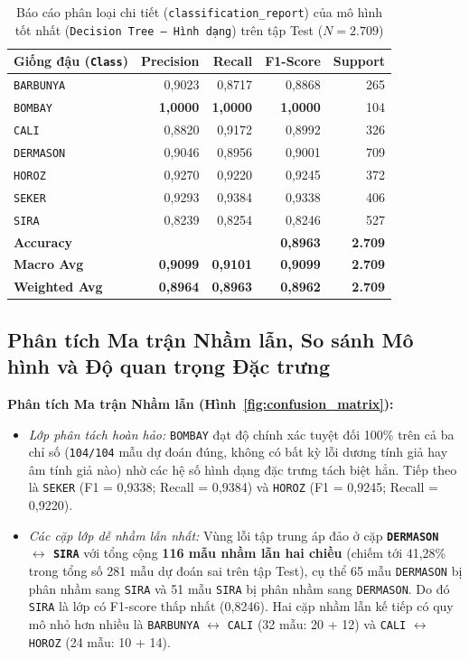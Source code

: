 \documentclass[a4paper,12pt]{report}
\begin{document}
\begin{table}[H]
\centering
\caption{Báo cáo phân loại chi tiết (\texttt{classification\_report}) của mô hình tốt nhất (\texttt{Decision Tree -- Hình dạng}) trên tập Test ($N = 2.709$)}
\label{tab:classification_report}
\begin{tabular}{@{}lrrrr@{}}
\toprule
\textbf{Giống đậu (\texttt{Class})} & \textbf{Precision} & \textbf{Recall} & \textbf{F1-Score} & \textbf{Support} \\
\midrule
\texttt{BARBUNYA} & 0,9023 & 0,8717 & 0,8868 & 265 \\
\texttt{BOMBAY} & \textbf{1,0000} & \textbf{1,0000} & \textbf{1,0000} & 104 \\
\texttt{CALI} & 0,8820 & 0,9172 & 0,8992 & 326 \\
\texttt{DERMASON} & 0,9046 & 0,8956 & 0,9001 & 709 \\
\texttt{HOROZ} & 0,9270 & 0,9220 & 0,9245 & 372 \\
\texttt{SEKER} & 0,9293 & 0,9384 & 0,9338 & 406 \\
\texttt{SIRA} & 0,8239 & 0,8254 & 0,8246 & 527 \\
\midrule
\textbf{Accuracy} & & & \textbf{0,8963} & \textbf{2.709} \\
\textbf{Macro Avg} & \textbf{0,9099} & \textbf{0,9101} & \textbf{0,9099} & \textbf{2.709} \\
\textbf{Weighted Avg} & \textbf{0,8964} & \textbf{0,8963} & \textbf{0,8962} & \textbf{2.709} \\
\bottomrule
\end{tabular}
\end{table}

\subsection{Phân tích Ma trận Nhầm lẫn, So sánh Mô hình và Độ quan trọng Đặc trưng}
\textbf{Phân tích Ma trận Nhầm lẫn (Hình~\ref{fig:confusion_matrix}):}
\begin{itemize}[leftmargin=*]
    \item \textit{Lớp phân tách hoàn hảo:} \texttt{BOMBAY} đạt độ chính xác tuyệt đối 100\% trên cả ba chỉ số (\texttt{104/104} mẫu dự đoán đúng, không có bất kỳ lỗi dương tính giả hay âm tính giả nào) nhờ các hệ số hình dạng đặc trưng tách biệt hẳn. Tiếp theo là \texttt{SEKER} (F1 = 0,9338; Recall = 0,9384) và \texttt{HOROZ} (F1 = 0,9245; Recall = 0,9220).
    \item \textit{Các cặp lớp dễ nhầm lẫn nhất:} Vùng lỗi tập trung áp đảo ở cặp \textbf{\texttt{DERMASON} $\leftrightarrow$ \texttt{SIRA}} với tổng cộng \textbf{116 mẫu nhầm lẫn hai chiều} (chiếm tới 41,28\% trong tổng số 281 mẫu dự đoán sai trên tập Test), cụ thể 65 mẫu \texttt{DERMASON} bị phân nhầm sang \texttt{SIRA} và 51 mẫu \texttt{SIRA} bị phân nhầm sang \texttt{DERMASON}. Do đó \texttt{SIRA} là lớp có F1-score thấp nhất (0,8246). Hai cặp nhầm lẫn kế tiếp có quy mô nhỏ hơn nhiều là \texttt{BARBUNYA} $\leftrightarrow$ \texttt{CALI} (32 mẫu: 20 + 12) và \texttt{CALI} $\leftrightarrow$ \texttt{HOROZ} (24 mẫu: 10 + 14).
\end{itemize}
\end{document}
